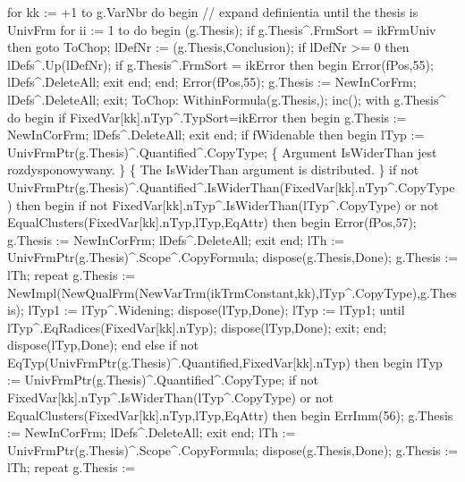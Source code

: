    for kk := +1 to g.VarNbr do
   begin
      // expand definientia until the thesis is UnivFrm
      for ii := 1 to  do
      begin
         (g.Thesis);
         if g.Thesis^.FrmSort = ikFrmUniv then goto ToChop;
         lDefNr := (g.Thesis,Conclusion);
         if lDefNr >= 0 then lDefs^.Up(lDefNr);
         if g.Thesis^.FrmSort = ikError then
         begin Error(fPos,55); lDefs^.DeleteAll; exit end;
      end;
      Error(fPos,55); g.Thesis := NewInCorFrm; lDefs^.DeleteAll; exit;
      ToChop:
         WithinFormula(g.Thesis,); inc();
         with g.Thesis^ do
      begin
         if FixedVar[kk].nTyp^.TypSort=ikError then
         begin g.Thesis := NewInCorFrm; lDefs^.DeleteAll; exit end;
         if fWidenable then
         begin lTyp := UnivFrmPtr(g.Thesis)^.Quantified^.CopyType;
         \{ Argument IsWiderThan jest rozdysponowywany. \}
         \{ The IsWiderThan argument is distributed. \}
         if not UnivFrmPtr(g.Thesis)^.Quantified^.IsWiderThan(FixedVar[kk].nTyp^.CopyType) then
         begin
            if not FixedVar[kk].nTyp^.IsWiderThan(lTyp^.CopyType)
               or not EqualClusters(FixedVar[kk].nTyp,lTyp,EqAttr) then
            begin Error(fPos,57); g.Thesis := NewInCorFrm; lDefs^.DeleteAll; exit end;
            lTh := UnivFrmPtr(g.Thesis)^.Scope^.CopyFormula;
            dispose(g.Thesis,Done);
            g.Thesis := lTh;
            repeat
               g.Thesis := 
                  NewImpl(NewQualFrm(NewVarTrm(ikTrmConstant,kk),lTyp^.CopyType),g.Thesis);
               lTyp1 := lTyp^.Widening;
               dispose(lTyp,Done);
               lTyp := lTyp1;
            until lTyp^.EqRadices(FixedVar[kk].nTyp);
            dispose(lTyp,Done); exit;
         end;
         dispose(lTyp,Done);
         end
         else if not EqTyp(UnivFrmPtr(g.Thesis)^.Quantified,FixedVar[kk].nTyp) then
         begin
            lTyp := UnivFrmPtr(g.Thesis)^.Quantified^.CopyType;
            if not FixedVar[kk].nTyp^.IsWiderThan(lTyp^.CopyType)
               or not EqualClusters(FixedVar[kk].nTyp,lTyp,EqAttr) then
            begin ErrImm(56); g.Thesis := NewInCorFrm; lDefs^.DeleteAll; exit end;
            lTh := UnivFrmPtr(g.Thesis)^.Scope^.CopyFormula;
            dispose(g.Thesis,Done);
            g.Thesis := lTh;
            repeat
               g.Thesis := 
